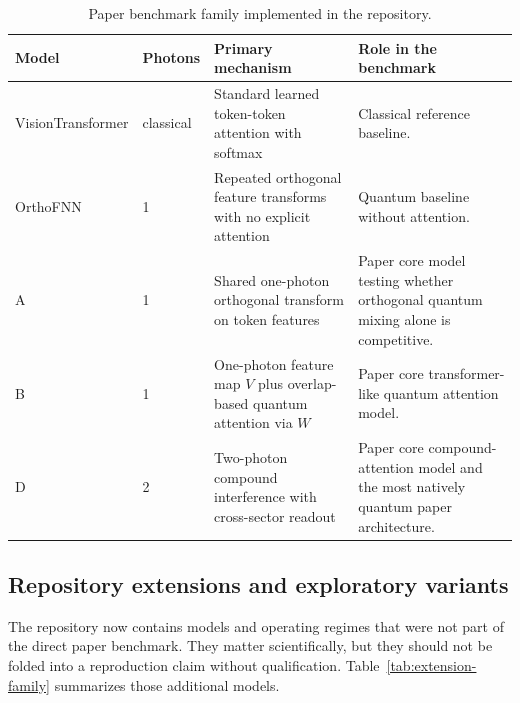 \documentclass[11pt,a4paper]{article}
\begin{document}
\begin{table}[tbp]
\centering
\caption{Paper benchmark family implemented in the repository.}
\label{tab:benchmark-family}
\small
\begin{tabularx}{\textwidth}{L{3.1cm}L{1.5cm}L{4.0cm}Y}
\toprule
Model & Photons & Primary mechanism & Role in the benchmark \\
\midrule
VisionTransformer & classical & Standard learned token-token attention with softmax & Classical reference baseline. \\
OrthoFNN & 1 & Repeated orthogonal feature transforms with no explicit attention & Quantum baseline without attention. \\
A & 1 & Shared one-photon orthogonal transform on token features & Paper core model testing whether orthogonal quantum mixing alone is competitive. \\
B & 1 & One-photon feature map \(V\) plus overlap-based quantum attention via \(W\) & Paper core transformer-like quantum attention model. \\
D & 2 & Two-photon compound interference with cross-sector readout & Paper core compound-attention model and the most natively quantum paper architecture. \\
\bottomrule
\end{tabularx}
\normalsize
\end{table}

\subsection{Repository extensions and exploratory variants}

The repository now contains models and operating regimes that were not part of the direct paper benchmark. They matter scientifically, but they should not be folded into a reproduction claim without qualification. Table~\ref{tab:extension-family} summarizes those additional models.
\end{document}
